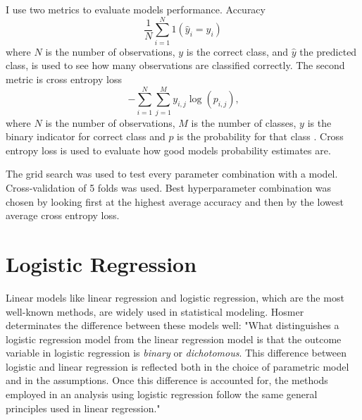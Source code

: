 I use two metrics to evaluate models performance. Accuracy
\begin{equation}
    \frac { 1 } { N} \sum _ { i = 1 } ^ {N} 1 \left( \hat { y } _ { i } = y _ { i } \right)
\end{equation}
where $N$ is the number of observations, $y$ is the correct class, and $\hat { y }$ the predicted class, is used to see how many observations are classified correctly. The second metric is cross entropy loss
\begin{equation}
    - \sum _ { i = 1 } ^ { N }\sum _ { j = 1 } ^ { M } y _ { i,j } \log \left( p _ { i,j } \right) \text{,}
\end{equation}
where $N$ is the number of observations, $M$ is the number of classes, $y$ is the binary indicator for correct class and $p$ is the probability for that class \cite{nasrabadi2007pattern}. Cross entropy loss is used to evaluate how good models probability estimates are.

The grid search was used to test every parameter combination with a model. Cross-validation of 5 folds was used. Best hyperparameter combination was chosen by looking first at the highest average accuracy and then by the lowest average cross entropy loss.

\section{Logistic Regression}
Linear models like linear regression and logistic regression, which are the most well-known methods, are widely used in statistical modeling. Hosmer\cite{hosmer2013applied} determinates the difference between these models well: "What distinguishes a logistic regression model from  the linear regression model is that the outcome variable in logistic regression is \textit{binary} or \textit{dichotomous}. This difference between logistic and linear regression is reflected both in the choice of parametric model and in the assumptions. Once this difference is accounted for, the methods employed in an analysis using logistic regression follow the same general principles used in linear regression."

